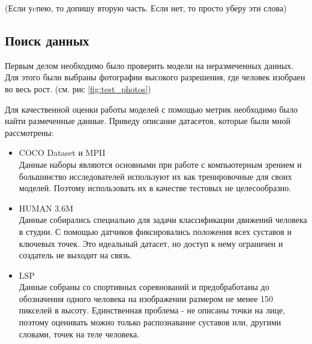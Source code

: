 (Если уcпею, то допишу вторую часть. Если нет, то просто уберу эти слова)

\subsection{Поиск данных}

Первым делом необходимо было проверить модели на неразмеченных данных. Для этого были выбраны фотографии высокого разрешения, где человек изобраен во весь рост. (см. рис \autoref{fig:test_photos})

Для качественной оценки работы моделей с помощью метрик необходимо было найти размеченные данные. Приведу описание датасетов, которые были мной рассмотрены:

\begin{itemize}
	\item COCO Dataset и MPII\\
	Данные наборы являются основными при работе с компьютерным зрением и большинство исследователей используют их как тренировочные для своих моделей. Поэтому использовать их в качестве тестовых не целесообразно. \cite{COCO_dataset, MPII_dataset}
	\item HUMAN 3.6M\\
	Данные собирались специально для задачи классификации движений человека в студии. С помощью датчиков фиксировались положения всех суставов и ключевых точек. Это идеальный датасет, но доступ к нему ограничен и создатель не выходит на связь. \cite{h36m_pami}
	\item LSP\\
	Данные собраны со спортивных соревнований и предобработаны до обозначения одного человека на изображении размером не менее 150 пикселей в высоту. Единственная проблема - не описаны точки на лице, поэтому оценивать можно только распознавание суставов или, другими словами, точек на теле человека. \cite{LSP}
\end{itemize}

